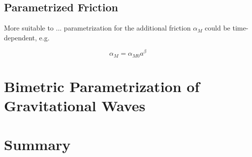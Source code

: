 \documentclass[parskip=half]{scrreprt}
\begin{document}
\section{Parametrized Friction}

More suitable to ... parametrization for the additional friction $\alpha_M$ could be time-dependent, e.g.

\begin{equation}
	\alpha_M = \alpha_{M0} a^\beta
\end{equation}



\chapter{Bimetric Parametrization of Gravitational Waves}


\chapter{Summary}
\end{document}
